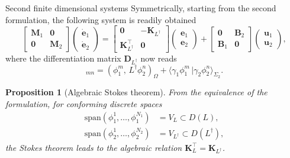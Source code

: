 \documentclass[aspectratio=169]{beamer}
\newcommand{\inner}[3][]{\ensuremath{( #2, \, #3 )_{#1}}}
\newcommand{\dualpr}[3][]{\ensuremath{\langle #2 \, \vert #3 \rangle_{#1}}}
\newtheorem{proposition}{Proposition}
\begin{document}
\begin{frame}{Second finite dimensional systems}
	Symmetrically, starting from the second formulation, the following system is readily obtained
	\begin{equation*}
		\begin{bmatrix}
			\mathbf{M}_1 & \mathbf{0} \\
			\mathbf{0} & \mathbf{M}_2
		\end{bmatrix} \begin{pmatrix}
			\dot{\mathbf{e}}_1 \\
			\dot{\mathbf{e}}_2
		\end{pmatrix} = \begin{bmatrix}
			\mathbf{0} & -\mathbf{K}_{L^\dag} \\
			\mathbf{K}_{L^\dag}^\top & \mathbf{0}
		\end{bmatrix} \begin{pmatrix}
			\mathbf{e}_1 \\
			\mathbf{e}_2
		\end{pmatrix} + 
		\begin{bmatrix}
			\mathbf{0} & \mathbf{B}_{2} \\
			\mathbf{B}_{1} & \mathbf{0}
		\end{bmatrix} \begin{pmatrix}
			\mathbf{u}_1 \\
			\mathbf{u}_2
		\end{pmatrix},
	\end{equation*}
	where the differentiation matrix $\mathbf{D}_{L^\dag}$ now reads
	\begin{equation*}
		[\mathbf{K}_{L^\dag}]_{mn} = \inner[\Omega]{\phi_1^m}{L^\dag \phi_2^n} + \dualpr[\Sigma_2]{\gamma_1 \phi_1^m}{\gamma_2 \phi_2^n}.
	\end{equation*}
	
	\begin{proposition}[Algebraic Stokes theorem]
		From the equivalence of the formulation, for conforming discrete spaces 
		\begin{equation*}
			\begin{aligned}
				\mathrm{span}(\phi_1^1, \dots, \phi_1^{N_1}) &= V_L \subset D(L), \\
				\mathrm{span}(\phi_2^1, \dots, \phi_2^{N_2}) &= V_{L^\dag} \subset D(L^\dag),
			\end{aligned}
		\end{equation*}
		 the Stokes theorem leads to the algebraic relation $\mathbf{K}_L^\top = \mathbf{K}_{L^\dag}$.
	\end{proposition}
	
\end{frame}
\end{document}
